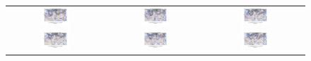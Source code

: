 \begin{figure}
	\centering
	\renewcommand{\arraystretch}{0.5}
	\begin{tabular}{ccc}
		\includegraphics[width=0.32\textwidth, trim=3cm 3cm 3cm 1.1cm, clip]{papers/rossby/images/data_2010_7_27_12_00_500.jpg} &
		\includegraphics[width=0.32\textwidth, trim=3cm 3cm 3cm 1.1cm, clip]{papers/rossby/images/data_2010_7_28_12_00_500.jpg} &
		\includegraphics[width=0.32\textwidth, trim=3cm 3cm 3cm 1.1cm, clip]{papers/rossby/images/data_2010_7_29_12_00_500.jpg}   \\
		\includegraphics[width=0.32\textwidth, trim=3cm 3cm 3cm 1.1cm, clip]{papers/rossby/images/data_2010_7_30_12_00_500.jpg} &
		\includegraphics[width=0.32\textwidth, trim=3cm 3cm 3cm 1.1cm, clip]{papers/rossby/images/data_2010_7_31_12_00_500.jpg} &
		\includegraphics[width=0.32\textwidth, trim=3cm 3cm 3cm 1.1cm, clip]{papers/rossby/images/data_2010_8_1_12_00_500.jpg}   \\

\end{tabular}
\end{figure}

